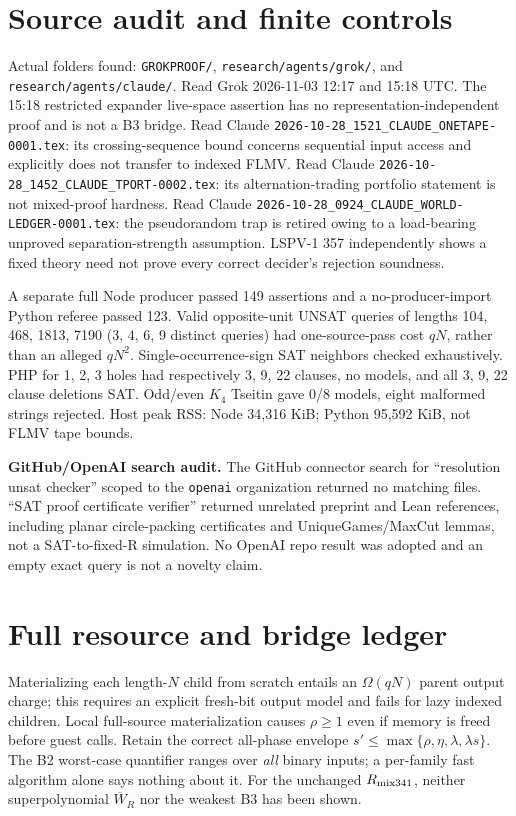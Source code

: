 \documentclass{article}
\begin{document}
\section*{Source audit and finite controls}
Actual folders found: \texttt{GROKPROOF/},
\texttt{research/agents/grok/}, and
\texttt{research/agents/claude/}. Read Grok 2026-11-03 12:17 and 15:18 UTC.
The 15:18 restricted expander live-space assertion has no
representation-independent proof and is not a B3 bridge.
Read Claude \texttt{2026-10-28\_1521\_CLAUDE\_ONETAPE-0001.tex}:
its crossing-sequence bound concerns sequential input access and
explicitly does not transfer to indexed FLMV.
Read Claude \texttt{2026-10-28\_1452\_CLAUDE\_TPORT-0002.tex}:
its alternation-trading portfolio statement is not mixed-proof hardness.
Read Claude \texttt{2026-10-28\_0924\_CLAUDE\_WORLD-LEDGER-0001.tex}:
the pseudorandom trap is retired owing to a load-bearing unproved
separation-strength assumption. LSPV-1 357 independently shows
a fixed theory need not prove every correct decider's rejection soundness.

A separate full Node producer passed 149 assertions and a no-producer-import
Python referee passed 123. Valid opposite-unit UNSAT queries of lengths
104, 468, 1813, 7190 (3, 4, 6, 9 distinct queries) had one-source-pass
cost $qN$, rather than an alleged $qN^2$. Single-occurrence-sign SAT
neighbors checked exhaustively. PHP for 1, 2, 3 holes had respectively
3, 9, 22 clauses, no models, and all 3, 9, 22 clause deletions SAT.
Odd/even $K_4$ Tseitin gave 0/8 models, eight malformed strings rejected.
Host peak RSS: Node 34,316 KiB; Python 95,592 KiB, not FLMV tape bounds.

\noindent\textbf{GitHub/OpenAI search audit.} The GitHub connector search for ``resolution unsat checker'' scoped to the \texttt{openai} organization returned no matching files. ``SAT proof certificate verifier'' returned unrelated preprint and Lean references, including planar circle-packing certificates and UniqueGames/MaxCut lemmas, not a SAT-to-fixed-R simulation. No OpenAI repo result was adopted and an empty exact query is not a novelty claim.

\section*{Full resource and bridge ledger}
Materializing each length-$N$ child from scratch entails an
$\Omega(qN)$ parent output charge; this requires an explicit fresh-bit
output model and fails for lazy indexed children. Local
full-source materialization causes $\rho\ge1$ even if memory is freed
before guest calls. Retain the correct all-phase envelope
$s'\le\max\{\rho,\eta,\lambda,\lambda s\}$.
The B2 worst-case quantifier ranges over \emph{all} binary inputs;
a per-family fast algorithm alone says nothing about it.
For the unchanged $R_{\rm mix341}$, neither superpolynomial
$\overline W_R$ nor the weakest B3 has been shown.
\end{document}
